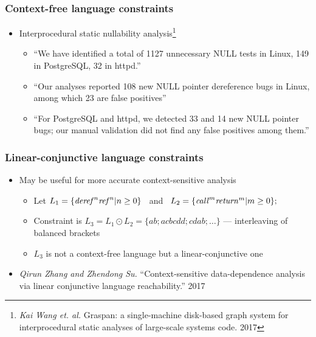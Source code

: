 \documentclass[xcolor=table,aspectratio=169]{beamer}
\begin{document}
\begin{frame}
  \transwipe[direction=90]
  \frametitle{Context-free language constraints}

\begin{itemize} 
\item Interprocedural static nullability analysis\footnote{\emph{Kai Wang et. al.} Graspan: a single-machine disk-based graph system for interprocedural 
static analyses of large-scale systems code. 2017}
  
\begin{itemize} 
   \item ``We have identified a total of 1127 unnecessary NULL tests in Linux, 149 in PostgreSQL, 
   32 in httpd.''
   \item ``Our analyses reported 108 new NULL pointer dereference bugs in Linux, among which 23 are false positives''
   \item ``For PostgreSQL and httpd, we detected 33 and 14 new NULL pointer bugs; our manual 
   validation did not find any false positives among them.''
\end{itemize}

\end{itemize}

\end{frame}

\begin{frame}
  \transwipe[direction=90]
  \frametitle{Linear-conjunctive language constraints}

\begin{itemize} 
  \item May be useful for more accurate context-sensitive analysis
    \begin{itemize}
      \item Let $L_1 = \{\text{\textit{deref}}^n \text{\textit{ref}}^n | n \geq 0\} $  \ and \ $ L_2 = \{\text{\textit{call}}^m \text{\textit{return}}^m | m \geq 0\};$ 
      \item Constraint is $L_3 = L_1 \odot L_2 = \{a b; a c b c d d; c d a b;  \dots\}$ --- interleaving of balanced brackets
      \item $L_3$ is not a context-free language but a linear-conjunctive one
    \end{itemize}

  \item \emph{Qirun Zhang and Zhendong Su.} ``Context-sensitive data-dependence analysis via linear conjunctive language reachability.'' 2017
  
\end{itemize}

\end{frame}
\end{document}
